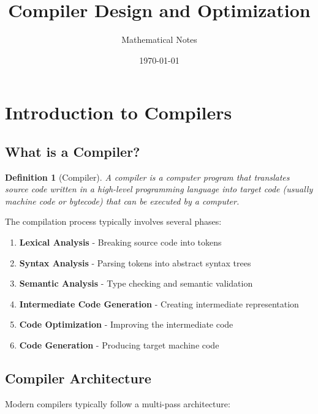 \documentclass[11pt]{article}
\title{Compiler Design and Optimization}
\author{Mathematical Notes}
\date{\today}
\newtheorem{definition}{Definition}[section]
\begin{document}
\maketitle
\tableofcontents
\newpage

\section{Introduction to Compilers}

\subsection{What is a Compiler?}

\begin{definition}[Compiler]
A compiler is a computer program that translates source code written in a high-level programming language into target code (usually machine code or bytecode) that can be executed by a computer.
\end{definition}

The compilation process typically involves several phases:
\begin{enumerate}
    \item \textbf{Lexical Analysis} - Breaking source code into tokens
    \item \textbf{Syntax Analysis} - Parsing tokens into abstract syntax trees
    \item \textbf{Semantic Analysis} - Type checking and semantic validation
    \item \textbf{Intermediate Code Generation} - Creating intermediate representation
    \item \textbf{Code Optimization} - Improving the intermediate code
    \item \textbf{Code Generation} - Producing target machine code
\end{enumerate}

\subsection{Compiler Architecture}

Modern compilers typically follow a multi-pass architecture:
\end{document}

